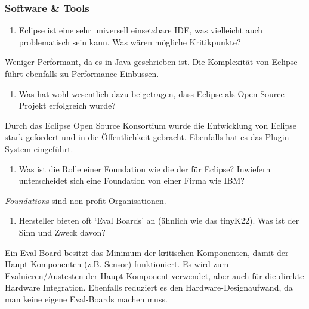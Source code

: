 \documentclass[
  10pt,
  a4paper,
]{article}
\providecommand{\tightlist}{%
  \setlength{\itemsep}{0pt}\setlength{\parskip}{0pt}}\usepackage{longtable,booktabs,array}
\numberwithin{equation}{section}
\begin{document}
\hypertarget{software-tools}{%
\subsubsection{Software \& Tools}\label{software-tools}}

\begin{enumerate}
\def\labelenumi{\arabic{enumi}.}
\tightlist
\item
  Eclipse ist eine sehr universell einsetzbare IDE, was vielleicht auch
  problematisch sein kann. Was wären mögliche Kritikpunkte?
\end{enumerate}

Weniger Performant, da es in Java geschrieben ist. Die Komplexität von
Eclipse führt ebenfalls zu Performance-Einbussen.

\begin{enumerate}
\def\labelenumi{\arabic{enumi}.}
\setcounter{enumi}{1}
\tightlist
\item
  Was hat wohl wesentlich dazu beigetragen, dass Eclipse als Open Source
  Projekt erfolgreich wurde?
\end{enumerate}

Durch das Eclipse Open Source Konsortium wurde die Entwicklung von
Eclipse stark gefördert und in die Öffentlichkeit gebracht. Ebenfalls
hat es das Plugin-System eingeführt.

\begin{enumerate}
\def\labelenumi{\arabic{enumi}.}
\setcounter{enumi}{2}
\tightlist
\item
  Was ist die Rolle einer Foundation wie die der für Eclipse? Inwiefern
  unterscheidet sich eine Foundation von einer Firma wie IBM?
\end{enumerate}

\emph{Foundation}s sind non-profit Organisationen.

\begin{enumerate}
\def\labelenumi{\arabic{enumi}.}
\setcounter{enumi}{3}
\tightlist
\item
  Hersteller bieten oft `Eval Boards' an (ähnlich wie das tinyK22). Was
  ist der Sinn und Zweck davon?
\end{enumerate}

Ein Eval-Board besitzt das Minimum der kritischen Komponenten, damit der
Haupt-Komponenten (z.B. Sensor) funktioniert. Es wird zum
Evaluieren/Austesten der Haupt-Komponent verwendet, aber auch für die
direkte Hardware Integration. Ebenfalls reduziert es den
Hardware-Designaufwand, da man keine eigene Eval-Boards machen muss.
\end{document}

